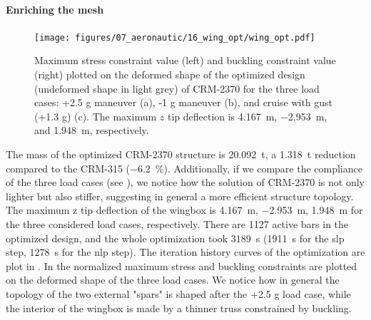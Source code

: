 \paragraph{Enriching the mesh}
\begin{figure}
    \centering
    \texttt{[image: figures/07\_aeronautic/16\_wing\_opt/wing\_opt.pdf]}
     \caption{Maximum stress constraint value (left) and buckling constraint value (right) plotted on the deformed shape of the optimized design (undeformed shape in light grey) of CRM-2370 for the three load cases: +2.5 g maneuver (a), -1 g maneuver (b), and cruise with gust (+1.3 g) (c). The maximum $z$ tip deflection is \qty{4.167}{m}, \qty{-2.953}{m}, and \qty{1.948}{m}, respectively.}
    \label{fig:07_wing_opt}
\end{figure}
The mass of the optimized CRM-2370 structure is \qty{20.092}{\tonne}, a \qty{1.318}{\tonne} reduction compared to the CRM-315 (\qty{-6.2}{\%}). Additionally, if we compare the compliance of the three load cases (see ), we notice how the solution of CRM-2370 is not only lighter but also stiffer, suggesting in general a more efficient structure topology. The maximum  z tip deflection of the wingbox is \qty{4.167}{m}, \qty{-2.953}{m}, \qty{1.948}{m} for the three considered load cases, respectively. There are 1127 active bars in the optimized design, and the whole optimization took \qty{3189}{s} (\qty{1911}{s} for the \gls{slp} step, \qty{1278}{s} for the \gls{nlp} step). The iteration history curves of the optimization are plot in . In  the normalized maximum stress and buckling constraints are plotted on the deformed shape of the three load cases. We notice how in general the topology of the two external "spars" is shaped after the +2.5 g load case, while the interior of the wingbox is made by a thinner truss constrained by buckling. 

